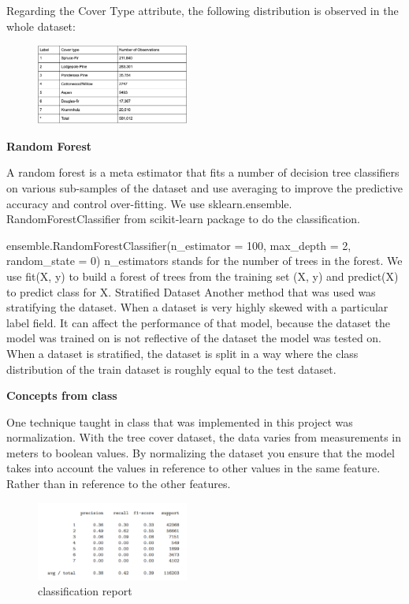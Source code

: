 \documentclass[conference]{IEEEtran}
\begin{document}
Regarding the Cover Type attribute, the following distribution is observed in the whole dataset:
\begin{figure}[htbp]
\centerline{\includegraphics[width=50mm,scale=0.5]{imgs/dataset_table}}
\label{fig}
\end{figure}

\noindent \textbf{Random Forest}

\noindent A random forest is a meta estimator that fits a number of decision tree classifiers on various sub-samples of the dataset and use averaging to improve the predictive accuracy and control over-fitting. We use sklearn.ensemble. RandomForestClassifier from scikit-learn package to do the classification. 

\noindent ensemble.RandomForestClassifier(n\_estimator = 100, max\_depth = 2, random\_state = 0)
n\_estimators stands for the number of trees in the forest.
We use fit(X, y) to build a forest of trees from the training set (X, y) and predict(X) to predict class for X.
Stratified Dataset
Another method that was used was stratifying the dataset. When a dataset is very highly skewed with a particular label field. It can affect the performance of that model, because the dataset the model was trained on is not reflective of the dataset the model was tested on. When a dataset is stratified, the dataset is split in a way where the class distribution of the train dataset is roughly equal to the test dataset. 

\noindent \textbf{Concepts from class}

\noindent One technique taught in class that was implemented in this project was normalization. With the tree cover dataset, the data varies from measurements in meters to boolean values. By normalizing the dataset you ensure that the model takes into account the values in reference to other values in the same feature. Rather 
than in reference to the other features.

\begin{figure}[htbp]
\centerline{\includegraphics[width=50mm,scale=0.5]{imgs/class_report}}
\caption{classification report}
\label{fig}
\end{figure}
\end{document}
